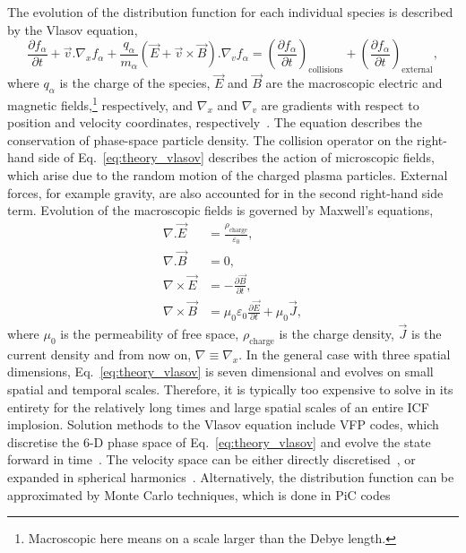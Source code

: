 The evolution of the distribution function for each individual species is described by the Vlasov equation,
\begin{equation}
    \label{eq:theory_vlasov}
    \frac{\partial f_\alpha}{\partial t} + \vec{v}.\nabla_x f_\alpha + \frac{q_\alpha}{m_\alpha} (\vec{E} + \vec{v}\times\vec{B}) . \nabla_v f_\alpha = \left ( \frac{\partial f_\alpha}{\partial t} \right )_\text{collisions} + \left ( \frac{\partial f_\alpha}{\partial t} \right )_\text{external},
\end{equation}
where $q_\alpha$ is the charge of the species, $\vec{E}$ and $\vec{B}$ are the macroscopic electric and magnetic fields,\footnote{Macroscopic here means on a scale larger than the Debye length.} respectively, and $\nabla_x$ and $\nabla_v$ are gradients with respect to position and velocity coordinates, respectively~\cite{bittencourt_fundamentals_2004}.
The equation describes the conservation of phase-space particle density.
The collision operator on the right-hand side of Eq.~\ref{eq:theory_vlasov} describes the action of microscopic fields, which arise due to the random motion of the charged plasma particles.
External forces, for example gravity, are also accounted for in the second right-hand side term.
Evolution of the macroscopic fields is governed by Maxwell's equations,
\begin{align}
    \label{eq:theory_maxwell_eqs_1}
    \nabla.\vec{E} &= \frac{\rho_{\text{charge}}}{\varepsilon_0},\\
    \label{eq:theory_maxwell_eqs_2}
    \nabla.\vec{B} &= 0,\\
    \label{eq:theory_maxwell_eqs_3}
    \nabla \times \vec{E} &= -\frac{\partial \vec{B}}{\partial t},\\
    \label{eq:theory_maxwell_eqs_4}
    \nabla \times \vec{B} &= \mu_0 \varepsilon_0\frac{\partial \vec{E}}{\partial t} + \mu_0 \vec{J},
\end{align}
where $\mu_0$ is the permeability of free space, $\rho_{\text{charge}}$ is the charge density, $\vec{J}$ is the current density and from now on, $\nabla\equiv \nabla_x$.
In the general case with three spatial dimensions, Eq.~\ref{eq:theory_vlasov} is seven dimensional and evolves on small spatial and temporal scales.
Therefore, it is typically too expensive to solve in its entirety for the relatively long times and large spatial scales of an entire \ac{ICF} implosion.
Solution methods to the Vlasov equation include \ac{VFP} codes, which discretise the 6-D phase space of Eq.~\ref{eq:theory_vlasov} and evolve the state forward in time~\cite{thomas_review_2012}.
The velocity space can be either directly discretised~\cite{taitano_eulerian_2021}, or expanded in spherical harmonics~\cite{kingham_implicit_2004}.
Alternatively, the distribution function can be approximated by Monte Carlo techniques, which is done in \ac{PiC} codes~\cite{arber_contemporary_2015}

